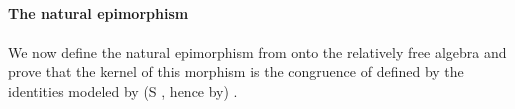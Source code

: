 \begin{code}
\AgdaSymbol{\}}\<%
\\
%
\\[\AgdaEmptyExtraSkip]%
%
\>[1]\AgdaSpace{}%
\AgdaSymbol{:}\AgdaSpace{}%
\AgdaSpace{}%
\AgdaSpace{}%
\AgdaSpace{}%
\AgdaSpace{}%
\AgdaSymbol{(}\AgdaSpace{}%
\AgdaSymbol{)}\AgdaSpace{}%
\AgdaSymbol{\AgdaUnderscore{}}\<%
\\
%
\>[1]\AgdaSpace{}%
\AgdaOperator{\AgdaFunction{𝔽[}}\AgdaSpace{}%
\AgdaSpace{}%
\AgdaOperator{\AgdaFunction{]}}\AgdaSpace{}%
\AgdaSymbol{=}\AgdaSpace{}%
\AgdaSpace{}%
\<%
\\
%
\>[1]\AgdaSpace{}%
\AgdaOperator{\AgdaFunction{𝔽[}}\AgdaSpace{}%
\AgdaSpace{}%
\AgdaOperator{\AgdaFunction{]}}\AgdaSpace{}%
\AgdaSymbol{=}\AgdaSpace{}%
\<%
\\
\>[1][@{}l@{\AgdaIndent{0}}]%
\>[2]\<%
\\
%
\>[2]\AgdaSpace{}%
\AgdaSymbol{:}\AgdaSpace{}%
\AgdaSpace{}%
\AgdaSymbol{\{}\AgdaSymbol{\}}\AgdaSpace{}%
\AgdaSpace{}%
\AgdaSpace{}%
\AgdaSpace{}%
\AgdaSpace{}%
\AgdaSymbol{(}\AgdaSpace{}%
\AgdaSymbol{)}\AgdaSpace{}%
\AgdaSpace{}%
\AgdaSpace{}%
\<%
\\
%
\>[2]\AgdaSpace{}%
\AgdaSpace{}%
\AgdaSymbol{(}\AgdaSpace{}%
\AgdaOperator{\AgdaInductiveConstructor{,}}\AgdaSpace{}%
\AgdaSymbol{)}%
\>[32]\AgdaSymbol{=}\AgdaSpace{}%
\AgdaSpace{}%
\AgdaSpace{}%
\<%
\\
%
\>[2]\AgdaSpace{}%
\AgdaSpace{}%
\AgdaSymbol{(}\AgdaSpace{}%
\AgdaOperator{\AgdaInductiveConstructor{,}}\AgdaSpace{}%
\AgdaSymbol{)}%
\>[32]\AgdaSymbol{=}\AgdaSpace{}%
\AgdaSpace{}%
\<%
\end{code}

\paragraph*{The natural epimorphism} %
We now define the natural epimorphism from  onto the relatively free algebra  and prove that
the kernel of this morphism is the congruence of  defined by the identities modeled by (\af S , hence by) .

